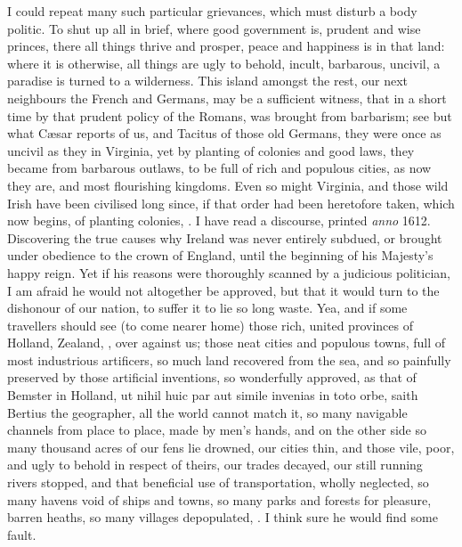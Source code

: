 {I could repeat many such particular grievances, which must disturb a
body politic. To shut up all in brief, where good government is,
prudent and wise princes, there all things thrive and prosper, peace
and happiness is in that land: where it is otherwise, all things are
ugly to behold, incult, barbarous, uncivil, a paradise is turned to a
wilderness. This island amongst the rest, our next neighbours the
French and Germans, may be a sufficient witness, that in a short time
by that prudent policy of the Romans, was brought from barbarism; see
but what C\ae{}sar reports of us, and Tacitus of those old Germans, they
were once as uncivil as they in Virginia, yet by planting of colonies
and good laws, they became from barbarous outlaws, to be full of
rich and populous cities, as now they are, and most flourishing
kingdoms. Even so might Virginia, and those wild Irish have been
civilised long since, if that order had been heretofore taken, which
now begins, of planting colonies, \etc{}. I have read a discourse,
printed \emph{anno} 1612. Discovering the true causes why Ireland was never
entirely subdued, or brought under obedience to the crown of England,
until the beginning of his Majesty's happy reign. Yet if his reasons
were thoroughly scanned by a judicious politician, I am afraid he would
not altogether be approved, but that it would turn to the dishonour of
our nation, to suffer it to lie so long waste. Yea, and if some
travellers should see (to come nearer home) those rich, united
provinces of Holland, Zealand, \etc{}, over against us; those neat cities
and populous towns, full of most industrious artificers, so much
land recovered from the sea, and so painfully preserved by those
artificial inventions, so wonderfully approved, as that of Bemster in
Holland, ut nihil huic par aut simile invenias in toto orbe, saith
Bertius the geographer, all the world cannot match it, so many
navigable channels from place to place, made by men's hands, \etc{} and on
the other side so many thousand acres of our fens lie drowned, our
cities thin, and those vile, poor, and ugly to behold in respect of
theirs, our trades decayed, our still running rivers stopped, and that
beneficial use of transportation, wholly neglected, so many havens void
of ships and towns, so many parks and forests for pleasure, barren
heaths, so many villages depopulated, \etc{}. I think sure he would find
some fault.

}
